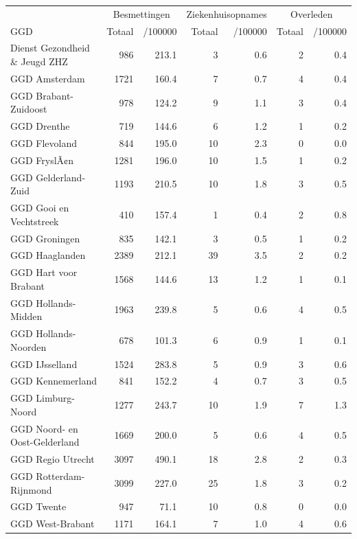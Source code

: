 \documentclass[
  english,
  man,floatsintext]{apa6}
\begin{document}
\begin{table}
\centering\begingroup\fontsize{10}{12}\selectfont

\begin{threeparttable}
\begin{tabular}{lrrrrrr}
\toprule
\multicolumn{1}{c}{ } & \multicolumn{2}{c}{Besmettingen} & \multicolumn{2}{c}{Ziekenhuisopnames} & \multicolumn{2}{c}{Overleden} \\
\cmidrule(l{3pt}r{3pt}){2-3} \cmidrule(l{3pt}r{3pt}){4-5} \cmidrule(l{3pt}r{3pt}){6-7}
GGD & Totaal & /100000 & Totaal & /100000 & Totaal & /100000\\
\midrule
Dienst Gezondheid \& Jeugd ZHZ & 986 & 213.1 & 3 & 0.6 & 2 & 0.4\\
GGD Amsterdam & 1721 & 160.4 & 7 & 0.7 & 4 & 0.4\\
GGD Brabant-Zuidoost & 978 & 124.2 & 9 & 1.1 & 3 & 0.4\\
GGD Drenthe & 719 & 144.6 & 6 & 1.2 & 1 & 0.2\\
GGD Flevoland & 844 & 195.0 & 10 & 2.3 & 0 & 0.0\\
GGD FryslÃ¢n & 1281 & 196.0 & 10 & 1.5 & 1 & 0.2\\
GGD Gelderland-Zuid & 1193 & 210.5 & 10 & 1.8 & 3 & 0.5\\
GGD Gooi en Vechtstreek & 410 & 157.4 & 1 & 0.4 & 2 & 0.8\\
GGD Groningen & 835 & 142.1 & 3 & 0.5 & 1 & 0.2\\
GGD Haaglanden & 2389 & 212.1 & 39 & 3.5 & 2 & 0.2\\
GGD Hart voor Brabant & 1568 & 144.6 & 13 & 1.2 & 1 & 0.1\\
GGD Hollands-Midden & 1963 & 239.8 & 5 & 0.6 & 4 & 0.5\\
GGD Hollands-Noorden & 678 & 101.3 & 6 & 0.9 & 1 & 0.1\\
GGD IJsselland & 1524 & 283.8 & 5 & 0.9 & 3 & 0.6\\
GGD Kennemerland & 841 & 152.2 & 4 & 0.7 & 3 & 0.5\\
GGD Limburg-Noord & 1277 & 243.7 & 10 & 1.9 & 7 & 1.3\\
GGD Noord- en Oost-Gelderland & 1669 & 200.0 & 5 & 0.6 & 4 & 0.5\\
GGD Regio Utrecht & 3097 & 490.1 & 18 & 2.8 & 2 & 0.3\\
GGD Rotterdam-Rijnmond & 3099 & 227.0 & 25 & 1.8 & 3 & 0.2\\
GGD Twente & 947 & 71.1 & 10 & 0.8 & 0 & 0.0\\
GGD West-Brabant & 1171 & 164.1 & 7 & 1.0 & 4 & 0.6\\

\end{tabular}
\end{threeparttable}
\end{table}
\end{document}
